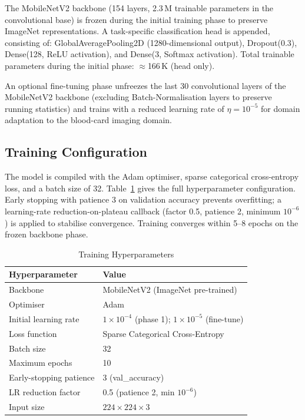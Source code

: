 \documentclass[journal]{IEEEtran}
\begin{document}
The MobileNetV2 backbone (154 layers, 2.3\,M trainable parameters
in the convolutional base) is frozen during the initial training
phase to preserve ImageNet representations.
A task-specific classification head is appended, consisting of:
GlobalAveragePooling2D (1280-dimensional output), Dropout(0.3),
Dense(128, ReLU activation), and Dense(3, Softmax activation).
Total trainable parameters during the initial phase:
$\approx$166\,K (head only).

An optional fine-tuning phase unfreezes the last 30 convolutional
layers of the MobileNetV2 backbone (excluding Batch-Normalisation
layers to preserve running statistics) and trains with a reduced
learning rate of $\eta{=}10^{-5}$ for domain adaptation to the
blood-card imaging domain.

\subsection{Training Configuration}

The model is compiled with the Adam optimiser, sparse categorical
cross-entropy loss, and a batch size of 32.
Table~\ref{tab:training} gives the full hyperparameter configuration.
Early stopping with patience 3 on validation accuracy prevents
overfitting; a learning-rate reduction-on-plateau callback
(factor 0.5, patience 2, minimum $10^{-6}$) is applied to
stabilise convergence.
Training converges within 5--8 epochs on the frozen backbone phase.

\begin{table}[htbp]
  \caption{Training Hyperparameters}
  \label{tab:training}
  \centering
  \renewcommand{\arraystretch}{1.1}
  \begin{tabular}{ll}
    \toprule
    \textbf{Hyperparameter} & \textbf{Value} \\
    \midrule
    Backbone                & MobileNetV2 (ImageNet pre-trained) \\
    Optimiser               & Adam \\
    Initial learning rate   & $1 \times 10^{-4}$ (phase 1); $1 \times 10^{-5}$ (fine-tune) \\
    Loss function           & Sparse Categorical Cross-Entropy \\
    Batch size              & 32 \\
    Maximum epochs          & 10 \\
    Early-stopping patience & 3 (val\_accuracy) \\
    LR reduction factor     & 0.5 (patience 2, min $10^{-6}$) \\
    Input size              & $224 \times 224 \times 3$ \\
    \bottomrule
  \end{tabular}
\end{table}
\end{document}
